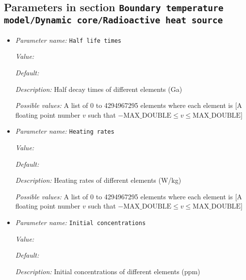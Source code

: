 \subsection{Parameters in section \tt Boundary temperature model/Dynamic core/Radioactive heat source}
\label{parameters:Boundary_20temperature_20model/Dynamic_20core/Radioactive_20heat_20source}

\begin{itemize}
\item {\it Parameter name:} {\tt Half life times}
\label{parameters:Boundary temperature model/Dynamic core/Radioactive heat source/Half life times}


{\it Value:} 


{\it Default:} 


{\it Description:} Half decay times of different elements (Ga)


{\it Possible values:} A list of 0 to 4294967295 elements where each element is [A floating point number $v$ such that $-\text{MAX\_DOUBLE} \leq v \leq \text{MAX\_DOUBLE}$]
\item {\it Parameter name:} {\tt Heating rates}
\label{parameters:Boundary temperature model/Dynamic core/Radioactive heat source/Heating rates}


{\it Value:} 


{\it Default:} 


{\it Description:} Heating rates of different elements (W/kg)


{\it Possible values:} A list of 0 to 4294967295 elements where each element is [A floating point number $v$ such that $-\text{MAX\_DOUBLE} \leq v \leq \text{MAX\_DOUBLE}$]
\item {\it Parameter name:} {\tt Initial concentrations}
\label{parameters:Boundary temperature model/Dynamic core/Radioactive heat source/Initial concentrations}


{\it Value:} 


{\it Default:} 


{\it Description:} Initial concentrations of different elements (ppm)



\end{itemize}
